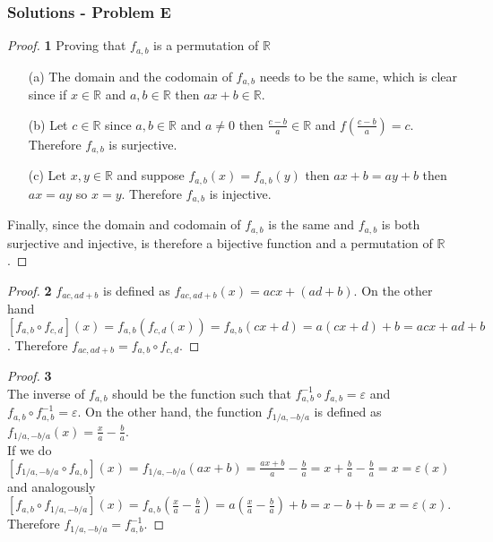 \documentclass[11pt]{article}
\begin{document}
	\subsubsection*{Solutions - Problem E}
	\begin{proof}{\textbf{1}}
		Proving that $f_{a,b}$ is a permutation of $\mathbb{R}$
		\begin{itemize}
			\item[(a)] The domain and the codomain of $f_{a,b}$ needs to be the same, which is clear since if $x \in \mathbb{R}$ and $a,b \in \mathbb{R}$ then $ax+b \in \mathbb{R}$.
			\item[(b)] Let $c \in \mathbb{R}$ since $a,b \in \mathbb{R}$ and $a \neq 0$ then $\frac{c-b}{a} \in \mathbb{R}$ and $f(\frac{c-b}{a}) = c$. Therefore $f_{a,b}$ is surjective.
			\item[(c)] Let $x,y \in \mathbb{R}$ and suppose $f_{a,b}(x) = f_{a,b}(y)$ then $ax+b = ay+b$ then $ax = ay$ so $x=y$. Therefore $f_{a,b}$ is injective.
		\end{itemize}
		Finally, since the domain and codomain of $f_{a,b}$ is the same and $f_{a,b}$ is both surjective and injective, is therefore a bijective function and a permutation of $\mathbb{R}$.
	\end{proof}
	\begin{proof}{\textbf{2}}
		$f_{ac,ad+b}$ is defined as $f_{ac,ad+b}(x)=acx + (ad + b)$. On the other hand $[f_{a,b} \circ f_{c,d}](x)=f_{a,b}(f_{c,d}(x))=f_{a,b}(cx+d)=a(cx+d)+b=acx+ad+b$. Therefore $f_{ac,ad+b}=f_{a,b} \circ f_{c,d}$.
	\end{proof}
	\begin{proof}{\textbf{3}}\\
		The inverse of $f_{a,b}$ should be the function such that $f^{-1}_{a,b} \circ f_{a,b} = \varepsilon$ and $f_{a,b} \circ f^{-1}_{a,b} = \varepsilon$. On the other hand, the function $f_{1/a,-b/a}$ is defined as $f_{1/a,-b/a}(x)=\frac{x}{a} -\frac{b}{a}$.\\
		If we do $[f_{1/a,-b/a} \circ f_{a,b}](x) = f_{1/a,-b/a}(ax+b) = \frac{ax+b}{a} -\frac{b}{a}=x+\frac{b}{a}-\frac{b}{a}=x=\varepsilon(x)$ and analogously $[f_{a,b} \circ f_{1/a,-b/a}](x) = f_{a,b}(\frac{x}{a}-\frac{b}{a}) = a(\frac{x}{a}-\frac{b}{a})+b = x -b +b = x =\varepsilon(x)$.\\ Therefore $f_{1/a,-b/a}=f^{-1}_{a,b}$.
	\end{proof}
\cleardoublepage
\end{document}
